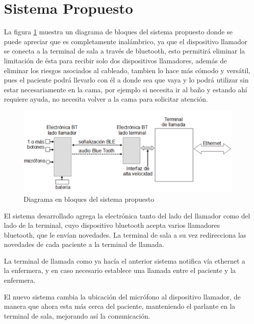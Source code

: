 
\section{Sistema Propuesto}

La figura \ref{fig:DiagramaBloques} muestra un diagrama de bloques del sistema propuesto donde se puede apreciar que es completamente inalámbrico, ya que el dispositivo llamador se conecta a la terminal de sala a través de bluetooth, esto permitirá eliminar la limitación de ésta para recibir solo dos dispositivos llamadores, además de eliminar los riesgos asociados al cableado, tambien lo hace más cómodo y versátil, pues el paciente podrá llevarlo con él a donde sea que vaya y lo podrá utilizar sin estar necesariamente en la cama, por ejemplo si necesita ir al baño y estando ahí requiere ayuda, no necesita volver a la cama para solicitar atención.

\begin{figure}[htpb]
	\centering
	\includegraphics[scale=0.5]{./Figures/DiagramaDeBloques.png}
	\caption{Diagrama en bloques del sistema propuesto}
	\label{fig:DiagramaBloques}
\end{figure}

El sistema desarrollado agrega la electrónica tanto del lado del llamador como del lado de la terminal, cuyo dispositivo bluetooth acepta varios llamadores bluetooth, que le envían novedades. La terminal de sala  a su vez redirecciona las novedades de cada paciente a la terminal de llamada.

La terminal de llamada como ya hacía el anterior sistema notifica vía ethernet a la enfermera, y en caso necesario establece una llamada entre el paciente y la enfermera.

El nuevo sistema cambia la ubicación del micrófono al dispositivo llamador, de manera que ahora esta más cerca del paciente, manteniendo el parlante en la terminal de sala, mejorando así la comunicación.

